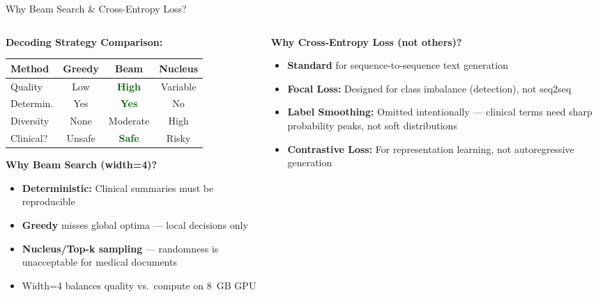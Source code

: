 \documentclass[10pt, aspectratio=169]{beamer}
\begin{document}
\begin{frame}{Why Beam Search \& Cross-Entropy Loss?}
  \footnotesize
  \begin{columns}[T]
    \begin{column}{0.48\textwidth}
      \textbf{Decoding Strategy Comparison:}
      \begin{table}
        \centering
        \scriptsize
        \renewcommand{\arraystretch}{1.15}
        \begin{tabular}{l|ccc}
          \toprule
          \textbf{Method} & \textbf{Greedy} & \textbf{Beam} & \textbf{Nucleus} \\
          \midrule
          Quality & Low & \textcolor{darkgreen}{\textbf{High}} & Variable \\
          Determin. & Yes & \textcolor{darkgreen}{\textbf{Yes}} & No \\
          Diversity & None & Moderate & High \\
          Clinical? & Unsafe & \textcolor{darkgreen}{\textbf{Safe}} & Risky \\
          \bottomrule
        \end{tabular}
      \end{table}
      \vspace{-0.1cm}
      \textbf{Why Beam Search (width=4)?}
      \begin{itemize}\setlength{\itemsep}{0pt}
        \item \textbf{Deterministic:} Clinical summaries must be reproducible
        \item \textbf{Greedy} misses global optima --- local decisions only
        \item \textbf{Nucleus/Top-k sampling} --- randomness is unacceptable for medical documents
        \item Width=4 balances quality vs.\ compute on 8~GB GPU
      \end{itemize}
    \end{column}
    \begin{column}{0.48\textwidth}
      \textbf{Why Cross-Entropy Loss (not others)?}
      \begin{itemize}\setlength{\itemsep}{0pt}
        \item \textbf{Standard} for sequence-to-sequence text generation
        \item \textbf{Focal Loss:} Designed for class imbalance (detection), not seq2seq
        \item \textbf{Label Smoothing:} Omitted intentionally --- clinical terms need sharp probability peaks, not soft distributions
        \item \textbf{Contrastive Loss:} For representation learning, not autoregressive generation
      \end{itemize}


\end{column}
\end{columns}
\end{frame}
\end{document}
